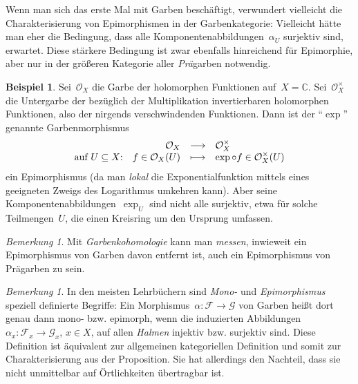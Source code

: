 \documentclass[a4paper,ngerman,12pt]{scrartcl}
\theoremstyle{definition}
\newtheorem{bsp}[defn]{Beispiel}
\theoremstyle{plain}
\theoremstyle{remark}
\newtheorem{bem}[defn]{Bemerkung}
\newcommand{\CC}{\mathbb{C}}
\newcommand{\F}{\mathcal{F}}
\newcommand{\G}{\mathcal{G}}
\renewcommand{\O}{\mathcal{O}}
\renewcommand{\_}{\mathpunct{.}\,}
\newcommand{\?}{\,{:}\,}
\begin{document}
Wenn man sich das erste Mal mit Garben beschäftigt, verwundert vielleicht die
Charakterisierung von Epimorphismen in der Garbenkategorie: Vielleicht hätte man eher die
Bedingung, dass alle Komponentenabbildungen~$\alpha_U$ surjektiv sind,
erwartet. Diese stärkere Bedingung ist zwar ebenfalls hinreichend für Epimorphie,
aber nur in der größeren Kategorie aller \emph{Prä}garben notwendig.

\begin{bsp}Sei~$\O_X$ die Garbe der holomorphen Funktionen auf~$X = \CC$.
Sei~$\O_X^\times$ die Untergarbe der bezüglich der Multiplikation
invertierbaren holomorphen Funktionen, also der nirgends verschwindenden
Funktionen. Dann ist der "`$\exp$"' genannte Garbenmorphismus
\[ \begin{array}{@{}rrcl@{}}
           & \O_X &\longrightarrow& \O_X^\times \\
  \text{auf $U \subseteq X$:} & f \in \O_X(U) &\longmapsto& \exp \circ f \in
  \O_X^\times(U)
\end{array} \]
ein Epimorphismus (da man \emph{lokal} die Exponentialfunktion mittels eines
geeigneten Zweigs des Logarithmus umkehren kann). Aber seine
Komponentenabbildungen~$\exp_U$ sind nicht alle surjektiv, etwa für solche
Teilmengen~$U$, die einen Kreisring um den Ursprung umfassen.\end{bsp}

\begin{bem}Mit \emph{Garbenkohomologie} kann man \emph{messen}, inwieweit ein
Epimorphismus von Garben davon entfernt ist, auch ein Epimorphismus von
Prägarben zu sein.
\end{bem}

\begin{bem}In den meisten Lehrbüchern sind \emph{Mono-} und \emph{Epimorphismus} speziell
definierte Begriffe: Ein Morphismus~$\alpha : \F \to \G$ von Garben heißt dort genau dann
mono- bzw. epimorph, wenn die induzierten Abbildungen~$\alpha_x : \F_x \to
\G_x$, $x \in X$, auf allen \emph{Halmen} injektiv bzw. surjektiv sind. Diese
Definition ist äquivalent zur allgemeinen kategoriellen Definition und somit
zur Charakterisierung aus der Proposition. Sie hat allerdings den Nachteil, dass sie nicht
unmittelbar auf Örtlichkeiten übertragbar ist.\end{bem}


\nocite{*}
\printbibliography
\end{document}
